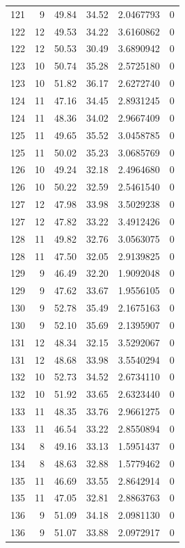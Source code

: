 \documentclass[
  letterpaper,
  DIV=11,
  numbers=noendperiod]{scrreprt}
\renewcommand{\[}{\begin{equation}}
\renewcommand{\]}{\end{equation}}
\begin{document}
\begin{table}
\begin{tabular*}{\linewidth}{@{\extracolsep{\fill}}rrrrrr}
121 & 9 & 49.84 & 34.52 & 2.0467793 & 0 \\ 
122 & 12 & 49.53 & 34.22 & 3.6160862 & 0 \\ 
122 & 12 & 50.53 & 30.49 & 3.6890942 & 0 \\ 
123 & 10 & 50.74 & 35.28 & 2.5725180 & 0 \\ 
123 & 10 & 51.82 & 36.17 & 2.6272740 & 0 \\ 
124 & 11 & 47.16 & 34.45 & 2.8931245 & 0 \\ 
124 & 11 & 48.36 & 34.02 & 2.9667409 & 0 \\ 
125 & 11 & 49.65 & 35.52 & 3.0458785 & 0 \\ 
125 & 11 & 50.02 & 35.23 & 3.0685769 & 0 \\ 
126 & 10 & 49.24 & 32.18 & 2.4964680 & 0 \\ 
126 & 10 & 50.22 & 32.59 & 2.5461540 & 0 \\ 
127 & 12 & 47.98 & 33.98 & 3.5029238 & 0 \\ 
127 & 12 & 47.82 & 33.22 & 3.4912426 & 0 \\ 
128 & 11 & 49.82 & 32.76 & 3.0563075 & 0 \\ 
128 & 11 & 47.50 & 32.05 & 2.9139825 & 0 \\ 
129 & 9 & 46.49 & 32.20 & 1.9092048 & 0 \\ 
129 & 9 & 47.62 & 33.67 & 1.9556105 & 0 \\ 
130 & 9 & 52.78 & 35.49 & 2.1675163 & 0 \\ 
130 & 9 & 52.10 & 35.69 & 2.1395907 & 0 \\ 
131 & 12 & 48.34 & 32.15 & 3.5292067 & 0 \\ 
131 & 12 & 48.68 & 33.98 & 3.5540294 & 0 \\ 
132 & 10 & 52.73 & 34.52 & 2.6734110 & 0 \\ 
132 & 10 & 51.92 & 33.65 & 2.6323440 & 0 \\ 
133 & 11 & 48.35 & 33.76 & 2.9661275 & 0 \\ 
133 & 11 & 46.54 & 33.22 & 2.8550894 & 0 \\ 
134 & 8 & 49.16 & 33.13 & 1.5951437 & 0 \\ 
134 & 8 & 48.63 & 32.88 & 1.5779462 & 0 \\ 
135 & 11 & 46.69 & 33.55 & 2.8642914 & 0 \\ 
135 & 11 & 47.05 & 32.81 & 2.8863763 & 0 \\ 
136 & 9 & 51.09 & 34.18 & 2.0981130 & 0 \\ 
136 & 9 & 51.07 & 33.88 & 2.0972917 & 0 \\ 

\end{tabular*}
\end{table}
\end{document}
